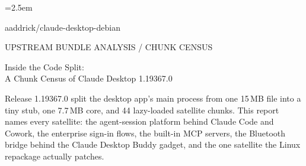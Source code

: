 \documentclass[11pt]{article}
\newcommand{\mono}{\ttfamily}
\begin{document}
\pagestyle{reportftr}
\sloppy
\emergencystretch=2.5em

\thispagestyle{reportftr}
\vspace*{14mm}
{\color{white}%
  {\heavy\fontsize{20}{22}\selectfont aaddrick/claude-desktop-debian}\par
  \vspace{12mm}
  {\mono\footnotesize{}\textcolor{white!82}{UPSTREAM BUNDLE ANALYSIS / CHUNK CENSUS}}\par
  \vspace{10pt}
  {\heavy\fontsize{31}{34}\selectfont Inside the Code Split: \\[2pt] A Chunk Census of Claude Desktop 1.19367.0\par}
  \vspace{11pt}
  {\fontsize{12.5}{17.5}\selectfont\textcolor{white!88}{\parbox{140mm}{Release 1.19367.0 split the desktop app's main process from one 15\,MB file into a tiny stub, one 7.7\,MB core, and 44 lazy-loaded satellite chunks. This report names every satellite: the agent-session platform behind Claude Code and Cowork, the enterprise sign-in flows, the built-in MCP servers, the Bluetooth bridge behind the Claude Desktop Buddy gadget, and the one satellite the Linux repackage actually patches.}}\par}
}
\vspace*{0pt}\vspace{7mm}
\end{document}
